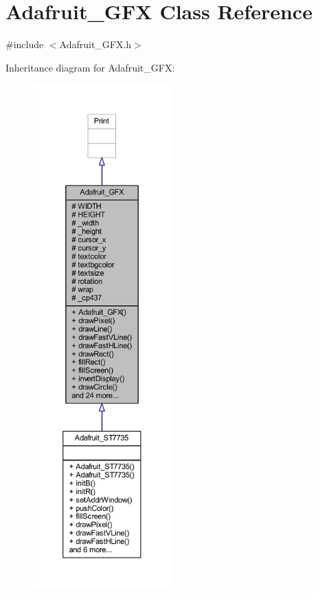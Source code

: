 \hypertarget{class_adafruit___g_f_x}{}\section{Adafruit\+\_\+\+G\+FX Class Reference}
\label{class_adafruit___g_f_x}


{\ttfamily \#include $<$Adafruit\+\_\+\+G\+F\+X.\+h$>$}



Inheritance diagram for Adafruit\+\_\+\+G\+FX\+:
\nopagebreak
\begin{figure}[H]
\begin{center}
\leavevmode
\includegraphics[height=550pt]{df/d49/class_adafruit___g_f_x__inherit__graph}
\end{center}
\end{figure}


